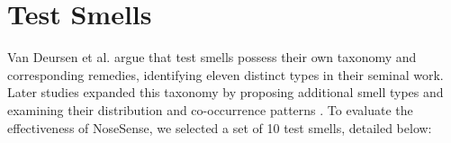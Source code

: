 \documentclass[sigconf]{acmart}
\begin{document}
\section{Test Smells}
\label{sec:test_smells}

Van Deursen et al. \cite{Deursen01} argue that test smells possess their own taxonomy and corresponding remedies, identifying eleven distinct types in their seminal work. Later studies expanded this taxonomy by proposing additional smell types and examining their distribution and co-occurrence patterns \cite{peruma2019distribution,virginio2020jnose,santana2025empirical,Virginio2019,bavota2015test,Deursen01}. To evaluate the effectiveness of NoseSense, we selected a set of 10 test smells, detailed below:
\end{document}
